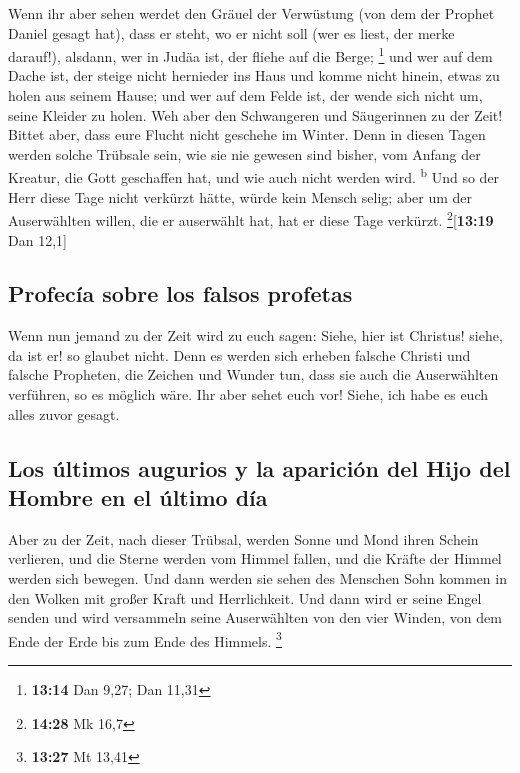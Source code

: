 Wenn ihr aber sehen werdet den Gräuel der Verwüstung
(von dem der Prophet Daniel gesagt hat), dass er steht, wo er nicht soll
(wer es liest, der merke darauf!), alsdann, wer in Judäa ist, der fliehe
auf die Berge; \footnote{\textbf{13:14} Dan 9,27; Dan 11,31}
 und wer auf dem Dache ist, der steige nicht hernieder
ins Haus und komme nicht hinein, etwas zu holen aus seinem Hause;
 und wer auf dem Felde ist, der wende sich nicht um,
seine Kleider zu holen.  Weh aber den Schwangeren und
Säugerinnen zu der Zeit!  Bittet aber, dass eure Flucht
nicht geschehe im Winter.  Denn in diesen Tagen werden
solche Trübsale sein, wie sie nie gewesen sind bisher, vom Anfang der
Kreatur, die Gott geschaffen hat, und wie auch nicht werden wird.
\textsuperscript{b}  Und so der Herr diese Tage nicht
verkürzt hätte, würde kein Mensch selig; aber um der Auserwählten
willen, die er auserwählt hat, hat er diese Tage verkürzt.
\footnote{\textbf{14:28} Mk 16,7}{[}\textbf{13:19} Dan 12,1{]}

\hypertarget{profecuxeda-sobre-los-falsos-profetas}{%
\subsection{Profecía sobre los falsos
profetas}\label{profecuxeda-sobre-los-falsos-profetas}}

 Wenn nun jemand zu der Zeit wird zu euch sagen: Siehe,
hier ist Christus! siehe, da ist er! so glaubet nicht. 
Denn es werden sich erheben falsche Christi und falsche Propheten, die
Zeichen und Wunder tun, dass sie auch die Auserwählten verführen, so es
möglich wäre.  Ihr aber sehet euch vor! Siehe, ich habe
es euch alles zuvor gesagt.

\hypertarget{los-uxfaltimos-augurios-y-la-apariciuxf3n-del-hijo-del-hombre-en-el-uxfaltimo-duxeda}{%
\subsection{Los últimos augurios y la aparición del Hijo del Hombre en
el último
día}\label{los-uxfaltimos-augurios-y-la-apariciuxf3n-del-hijo-del-hombre-en-el-uxfaltimo-duxeda}}

 Aber zu der Zeit, nach dieser Trübsal, werden Sonne und
Mond ihren Schein verlieren,  und die Sterne werden vom
Himmel fallen, und die Kräfte der Himmel werden sich bewegen.
 Und dann werden sie sehen des Menschen Sohn kommen in
den Wolken mit großer Kraft und Herrlichkeit.  Und dann
wird er seine Engel senden und wird versammeln seine Auserwählten von
den vier Winden, von dem Ende der Erde bis zum Ende des Himmels.
\footnote{\textbf{13:27} Mt 13,41}

